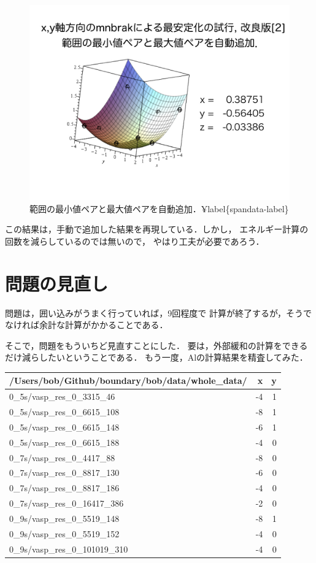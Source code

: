 \begin{figure}[H][htbp]
\centering
\begin{center}
\includegraphics[width=150mm]{../.././figs/thesis/thesis_010.jpeg}
\end{center}
\caption{範囲の最小値ペアと最大値ペアを自動追加．¥label\{spandata-label\}}

\label{fig:}
\end{figure}

この結果は，手動で追加した結果を再現している．しかし，
エネルギー計算の回数を減らしているのでは無いので，
やはり工夫が必要であろう．

    \section{問題の見直し}\label{ux554fux984cux306eux898bux76f4ux3057}

問題は，囲い込みがうまく行っていれば，9回程度で
計算が終了するが，そうでなければ余計な計算がかかることである．

そこで，問題をもういちど見直すことにした．
要は，外部緩和の計算をできるだけ減らしたいということである．
もう一度，Alの計算結果を精査してみた．

\begin{longtable}[]{@{}lrr@{}}
\toprule
/Users/bob/Github/boundary/bob/data/whole\_data/ & x & y\tabularnewline
\midrule
\endhead
0\_5s/vasp\_res\_0\_3315\_46 & -4 & 1\tabularnewline
0\_5s/vasp\_res\_0\_6615\_108 & -8 & 1\tabularnewline
0\_5s/vasp\_res\_0\_6615\_148 & -6 & 1\tabularnewline
0\_5s/vasp\_res\_0\_6615\_188 & -4 & 0\tabularnewline
0\_7s/vasp\_res\_0\_4417\_88 & -8 & 0\tabularnewline
0\_7s/vasp\_res\_0\_8817\_130 & -6 & 0\tabularnewline
0\_7s/vasp\_res\_0\_8817\_186 & -4 & 0\tabularnewline
0\_7s/vasp\_res\_0\_16417\_386 & -2 & 0\tabularnewline
0\_9s/vasp\_res\_0\_5519\_148 & -8 & 1\tabularnewline
0\_9s/vasp\_res\_0\_5519\_152 & -4 & 0\tabularnewline
0\_9s/vasp\_res\_0\_101019\_310 & -4 & 0\tabularnewline
\bottomrule
\end{longtable}

